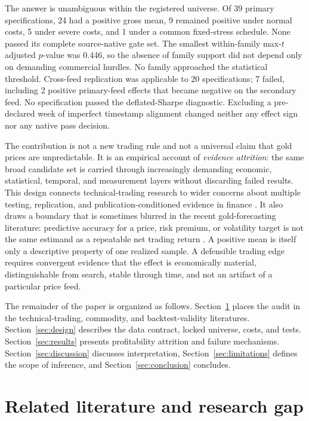The answer is unambiguous within the registered universe. Of 39 primary specifications, 24 had a positive gross mean, 9 remained positive under normal costs, 5 under severe costs, and 1 under a common fixed-stress schedule. None passed its complete source-native gate set. The smallest within-family max-$t$ adjusted $p$-value was 0.446, so the absence of family support did not depend only on demanding commercial hurdles. No family approached the statistical threshold. Cross-feed replication was applicable to 20 specifications; 7 failed, including 2 positive primary-feed effects that became negative on the secondary feed. No specification passed the deflated-Sharpe diagnostic. Excluding a pre-declared week of imperfect timestamp alignment changed neither any effect sign nor any native pass decision.

The contribution is not a new trading rule and not a universal claim that gold prices are unpredictable. It is an empirical account of \emph{evidence attrition}: the same broad candidate set is carried through increasingly demanding economic, statistical, temporal, and measurement layers without discarding failed results. This design connects technical-trading research to wider concerns about multiple testing, replication, and publication-conditioned evidence in finance \citep{harvey2016,mclean2016,hou2020}. It also draws a boundary that is sometimes blurred in the recent gold-forecasting literature: predictive accuracy for a price, risk premium, or volatility target is not the same estimand as a repeatable net trading return \citep{cohen2023,diaz2023,you2025}. A positive mean is itself only a descriptive property of one realized sample. A defensible trading edge requires convergent evidence that the effect is economically material, distinguishable from search, stable through time, and not an artifact of a particular price feed.

The remainder of the paper is organized as follows. Section~\ref{sec:literature} places the audit in the technical-trading, commodity, and backtest-validity literatures. Section~\ref{sec:design} describes the data contract, locked universe, costs, and tests. Section~\ref{sec:results} presents profitability attrition and failure mechanisms. Section~\ref{sec:discussion} discusses interpretation, Section~\ref{sec:limitations} defines the scope of inference, and Section~\ref{sec:conclusion} concludes.

\section{Related literature and research gap}\label{sec:literature}

